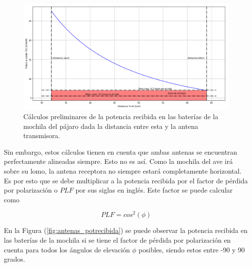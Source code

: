 \begin{figure}[H]
	\centering
	\includegraphics[width=\linewidth]{ImagenesFactibilidad/antenas_preliminar}
	\caption{Cálculos preliminares de la potencia recibida en las baterías de la mochila del pájaro dada la distancia entre esta y la antena transmisora.}
	\label{fig:antenas_preliminar}
\end{figure}

Sin embargo, estos cálculos tienen en cuenta que ambas antenas se encuentran perfectamente alineadas siempre. Esto no es así. Como la mochila del ave irá sobre su lomo, la antena receptora no siempre estará completamente horizontal. Es por esto que se debe multiplicar a la potencia recibida por el factor de pérdida por polarización o $PLF$ por sus siglas en inglés. Este factor se puede calcular como

\begin{equation}
PLF = cos^2(\phi)
\end{equation}

En la Figura (\ref{fig:antenas_potrecibida}) se puede observar la potencia recibida en las baterías de la mochila si se tiene el factor de pérdida por polarización en cuenta para todos los ángulos de elevación $\phi$ posibles, siendo estos entre -90 y 90 grados.

